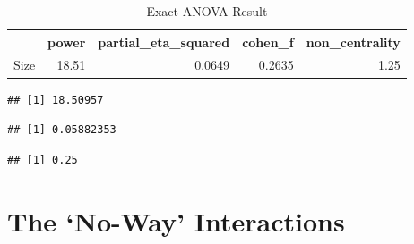 \documentclass[]{book}
\newenvironment{Shaded}{\begin{snugshade}}{\end{snugshade}}
\newcommand{\CommentTok}[1]{\textcolor[rgb]{0.56,0.35,0.01}{\textit{#1}}}
\newcommand{\DecValTok}[1]{\textcolor[rgb]{0.00,0.00,0.81}{#1}}
\newcommand{\KeywordTok}[1]{\textcolor[rgb]{0.13,0.29,0.53}{\textbf{#1}}}
\newcommand{\NormalTok}[1]{#1}
\newcommand{\OperatorTok}[1]{\textcolor[rgb]{0.81,0.36,0.00}{\textbf{#1}}}
\newcommand{\StringTok}[1]{\textcolor[rgb]{0.31,0.60,0.02}{#1}}
\begin{document}
\begin{table}[!h]

\caption{\label{tab:unnamed-chunk-212}Exact ANOVA Result}
\centering
\begin{tabular}{l|r|r|r|r}
\hline
  & power & partial\_eta\_squared & cohen\_f & non\_centrality\\
\hline
Size & 18.51 & 0.0649 & 0.2635 & 1.25\\
\hline
\end{tabular}
\end{table}

\begin{Shaded}
\end{Shaded}

\begin{verbatim}
## [1] 18.50957
\end{verbatim}

\begin{Shaded}
\end{Shaded}

\begin{verbatim}
## [1] 0.05882353
\end{verbatim}

\begin{Shaded}
\end{Shaded}

\begin{verbatim}
## [1] 0.25
\end{verbatim}

\hypertarget{the-no-way-interactions}{%
\chapter{The `No-Way' Interactions}\label{the-no-way-interactions}}
\end{document}
